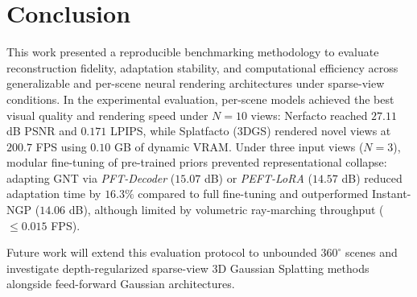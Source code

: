 \section{Conclusion}

This work presented a reproducible benchmarking methodology to evaluate reconstruction fidelity, adaptation stability, and computational efficiency across generalizable and per-scene neural rendering architectures under sparse-view conditions. In the experimental evaluation, per-scene models achieved the best visual quality and rendering speed under $N=10$ views: Nerfacto reached $27.11$ dB PSNR and $0.171$ LPIPS, while Splatfacto (3DGS) rendered novel views at $200.7$ FPS using $0.10$ GB of dynamic VRAM. Under three input views ($N=3$), modular fine-tuning of pre-trained priors prevented representational collapse: adapting GNT via \textit{PFT-Decoder} ($15.07$ dB) or \textit{PEFT-LoRA} ($14.57$ dB) reduced adaptation time by $16.3\%$ compared to full fine-tuning and outperformed Instant-NGP ($14.06$ dB), although limited by volumetric ray-marching throughput ($\le 0.015$ FPS).

Future work will extend this evaluation protocol to unbounded $360^\circ$ scenes and investigate depth-regularized sparse-view 3D Gaussian Splatting methods \cite{seo2026improvingsparseview3dgsgeneralization, song2025d2gsdepthanddensityguidedgaussian} alongside feed-forward Gaussian architectures.
